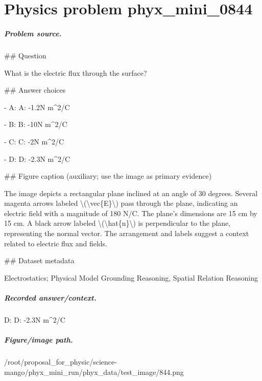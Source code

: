 
\chapter{Physics problem phyx\_mini\_0844}
\label{ch:PhyXMiniProblems_problem_phyx_mini_0844}

\paragraph{Problem source.}
\#\# Question

What is the electric flux through the surface?

\#\# Answer choices

- A: A: -1.2N m\textasciicircum{}2/C

- B: B: -10N m\textasciicircum{}2/C

- C: C: -2N m\textasciicircum{}2/C

- D: D: -2.3N m\textasciicircum{}2/C

\#\# Figure caption (auxiliary; use the image as primary evidence)

The image depicts a rectangular plane inclined at an angle of 30 degrees. Several magenta arrows labeled \textbackslash{}(\textbackslash{}vec\{E\}\textbackslash{}) pass through the plane, indicating an electric field with a magnitude of 180 N/C. The plane's dimensions are 15 cm by 15 cm. A black arrow labeled \textbackslash{}(\textbackslash{}hat\{n\}\textbackslash{}) is perpendicular to the plane, representing the normal vector. The arrangement and labels suggest a context related to electric flux and fields.

\#\# Dataset metadata

Electrostatics; Physical Model Grounding Reasoning, Spatial Relation Reasoning

\paragraph{Recorded answer/context.}
D: D: -2.3N m\textasciicircum{}2/C

\paragraph{Figure/image path.}
/root/proposal\_for\_physic/science-mango/phyx\_mini\_run/phyx\_data/test\_image/844.png


